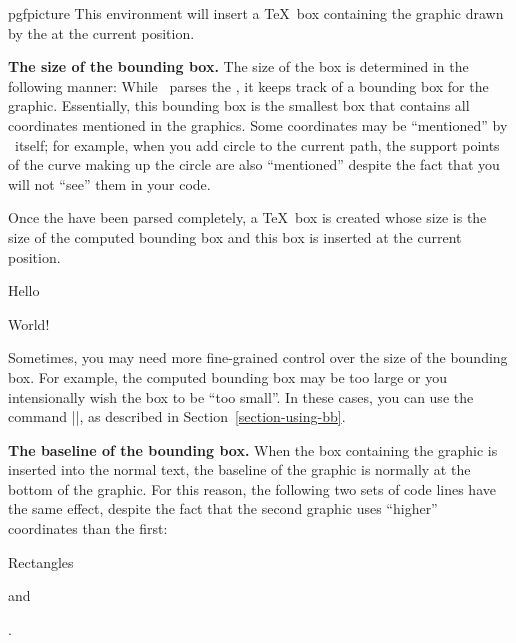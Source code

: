 \begin{environment}{{pgfpicture}}
    This environment will insert a \TeX\ box containing the graphic drawn by
    the  at the current position.


    \medskip
    \textbf{The size of the bounding box.}
    The size of the box is determined in the following manner: While \pgfname\
    parses the , it keeps track of a bounding box
    for the graphic. Essentially, this bounding box is the smallest box that
    contains all coordinates mentioned in the graphics. Some coordinates may be
    ``mentioned'' by \pgfname\ itself; for example, when you add circle to the
    current path, the support points of the curve making up the circle are also
    ``mentioned'' despite the fact that you will not ``see'' them in your code.

    Once the  have been parsed completely, a \TeX\
    box is created whose size is the size of the computed bounding box and this
    box is inserted at the current position.
\begin{codeexample}[]
Hello \begin{pgfpicture}
  \pgfpathrectangle{\pgfpointorigin}{\pgfpoint{2ex}{1ex}}
  \pgfusepath{stroke}
\end{pgfpicture} World!
\end{codeexample}

    Sometimes, you may need more fine-grained control over the size of the
    bounding box. For example, the computed bounding box may be too large or
    you intensionally wish the box to be ``too small''. In these cases, you can
    use the command |\pgfusepath{use as bounding box}|, as described in
    Section~\ref{section-using-bb}.


    \medskip
    \textbf{The baseline of the bounding box.}
    When the box containing the graphic is inserted into the normal text, the
    baseline of the graphic is normally at the bottom of the graphic. For this
    reason, the following two sets of code lines have the same effect, despite
    the fact that the second graphic uses ``higher'' coordinates than the
    first:
\begin{codeexample}[]
Rectangles \begin{pgfpicture}
  \pgfpathrectangle{\pgfpointorigin}{\pgfpoint{2ex}{1ex}}
\end{pgfpicture} and \begin{pgfpicture}
  \pgfpathrectangle{\pgfpoint{0ex}{1ex}}{\pgfpoint{2ex}{1ex}}
  \pgfusepath{stroke}
\end{pgfpicture}.
\end{codeexample}


\end{environment}
